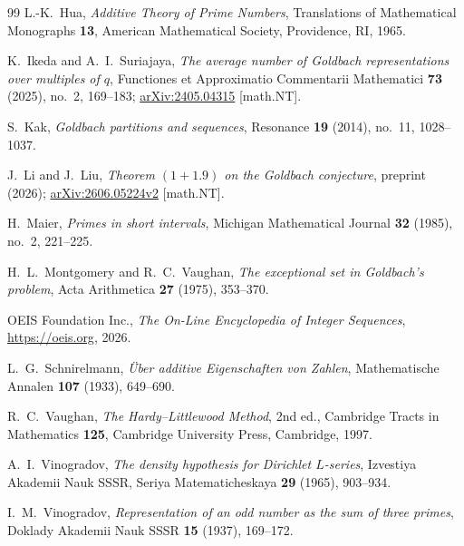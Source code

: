 \documentclass[11pt]{article}
\theoremstyle{plain}
\theoremstyle{definition}
\begin{document}
\begin{thebibliography}{99}
L.-K.~Hua, \emph{Additive Theory of Prime Numbers},
Translations of Mathematical Monographs \textbf{13}, American
Mathematical Society, Providence, RI, 1965.

K.~Ikeda and A.~I.~Suriajaya, \emph{The average number of
Goldbach representations over multiples of $q$}, Functiones et
Approximatio Commentarii Mathematici \textbf{73} (2025), no.~2,
169--183;
\href{https://arxiv.org/abs/2405.04315}{arXiv:2405.04315} [math.NT].

S.~Kak, \emph{Goldbach partitions and sequences}, Resonance
\textbf{19} (2014), no.~11, 1028--1037.

J.~Li and J.~Liu, \emph{Theorem $(1+1.9)$ on the Goldbach
conjecture}, preprint (2026);
\href{https://arxiv.org/abs/2606.05224}{arXiv:2606.05224v2} [math.NT].

H.~Maier, \emph{Primes in short intervals}, Michigan Mathematical
Journal \textbf{32} (1985), no.~2, 221--225.

H.~L.~Montgomery and R.~C.~Vaughan, \emph{The exceptional set in
Goldbach's problem}, Acta Arithmetica \textbf{27} (1975), 353--370.

OEIS Foundation Inc., \emph{The On-Line Encyclopedia of Integer
Sequences}, \url{https://oeis.org}, 2026.

L.~G.~Schnirelmann, \emph{\"Uber additive Eigenschaften von
Zahlen}, Mathematische Annalen \textbf{107} (1933), 649--690.

R.~C.~Vaughan, \emph{The Hardy--Littlewood Method}, 2nd ed.,
Cambridge Tracts in Mathematics \textbf{125}, Cambridge
University Press, Cambridge, 1997.

A.~I.~Vinogradov, \emph{The density hypothesis for Dirichlet
$L$-series}, Izvestiya Akademii Nauk SSSR, Seriya Matematicheskaya
\textbf{29} (1965), 903--934.

I.~M.~Vinogradov, \emph{Representation of an odd number as the
sum of three primes}, Doklady Akademii Nauk SSSR \textbf{15}
(1937), 169--172.

\end{thebibliography}
\end{document}
